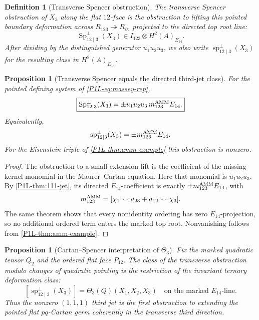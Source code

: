 \documentclass[11pt]{article}
\newtheorem{proposition}[theorem]{Proposition}
\newtheorem{definition}[theorem]{Definition}
\theoremstyle{remark}
\begin{document}
\begin{definition}[Transverse Spencer obstruction]
\label{P1L-def:transverse-spencer}
The \emph{transverse Spencer obstruction of \(X_3\) along the flat
\(12\)-face} is the obstruction to lifting this pointed boundary deformation
across
\(R_{123}\twoheadrightarrow R_{\partial}\), projected to the directed top
root line:
\[
 \operatorname{Sp}^{\perp}_{12\mid3}(X_3)
 \in
 I_{123}\otimes H^2(A)_{E_{14}}.
\]
After dividing by the distinguished generator \(u_1u_2u_3\), we also write
\(\operatorname{sp}^{\perp}_{12\mid3}(X_3)\) for the resulting class in
\(H^2(A)_{E_{14}}\).
\end{definition}

\begin{proposition}[Transverse Spencer equals the directed third-jet class]
\label{P1L-thm:transverse-spencer-massey}
For the pointed defining system of \cref{P1L-eq:massey-rep},
\[
 \boxed{
 \operatorname{Sp}^{\perp}_{12\mid3}(X_3)
 =\pm u_1u_2u_3\,m_{123}^{\rm AMM}E_{14}.}
\]
Equivalently,
\[
 \operatorname{sp}^{\perp}_{12\mid3}(X_3)
 =\pm m_{123}^{\rm AMM}E_{14}.
\]
For the Eisenstein triple of \cref{P1L-thm:amm-example} this obstruction is
nonzero.
\end{proposition}

\begin{proof}
The obstruction to a small-extension lift is the coefficient of the missing
kernel monomial in the Maurer--Cartan equation.  Here that monomial is
\(u_1u_2u_3\).  By \cref{P1L-thm:111-jet}, its directed \(E_{14}\)-coefficient is
exactly
\(\pm m_{123}^{\rm AMM}E_{14}\), with
\[
 m_{123}^{\rm AMM}
 =[\chi_1\smile a_{23}+a_{12}\smile\chi_3].
\]
The same theorem shows that every nonidentity ordering has zero
\(E_{14}\)-projection, so no additional ordered term enters the marked top
root.  Nonvanishing follows from \cref{P1L-thm:amm-example}.
\end{proof}

\begin{proposition}[Cartan--Spencer interpretation of \(\Theta_3\)]
\label{P1L-thm:theta3-spencer}
Fix the marked quadratic tensor \(Q_2\) and the ordered flat face
\(P_{12}\).  The class of the transverse obstruction modulo changes of
quadratic pointing is the restriction of the invariant ternary deformation
class:
\[
 \boxed{
 [\operatorname{sp}^{\perp}_{12\mid3}(X_3)]
 =\Theta_3(Q)(X_1,X_2,X_3)
 \quad\text{on the marked }E_{14}\text{-line}.}
\]
Thus the nonzero \((1,1,1)\) third jet is the first obstruction to extending
the pointed flat \(pq\)-Cartan germ coherently in the transverse third
direction.
\end{proposition}
\end{document}
